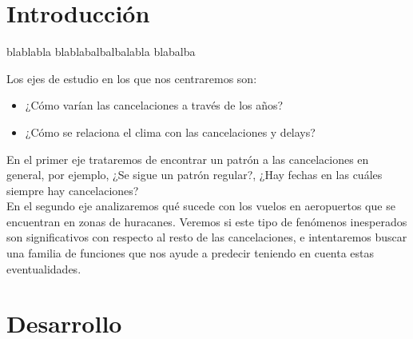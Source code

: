 \section{Introducción}

blablabla
blablabalbalbalabla
blabalba

Los ejes de estudio en los que nos centraremos son:
\begin{itemize}
    \item ¿Cómo varían las cancelaciones a través de los años?
    \item ¿Cómo se relaciona el clima con las cancelaciones y delays?
\end{itemize}

En el primer eje trataremos de encontrar un patrón a las cancelaciones en general, por ejemplo, ¿Se sigue un patrón regular?, ¿Hay fechas en las cuáles siempre hay cancelaciones? \\

En el segundo eje analizaremos qué sucede con los vuelos en aeropuertos que se encuentran en zonas de huracanes. Veremos si este tipo de fenómenos inesperados son significativos con respecto al resto de las cancelaciones, e intentaremos buscar una familia de funciones que nos ayude a predecir teniendo en cuenta estas eventualidades. \\

\section{Desarrollo}

